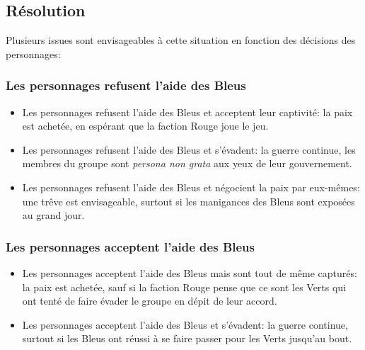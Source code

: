 \subsection{Résolution}

Plusieurs issues sont envisageables à cette situation en fonction des décisions des personnages:

\subsubsection{Les personnages refusent l'aide des Bleus}
\begin{itemize}
	\item Les personnages refusent l'aide des Bleus et acceptent leur captivité: la paix est achetée, en espérant que la faction Rouge joue le jeu.
	\item Les personnages refusent l'aide des Bleus et s'évadent: la guerre continue, les membres du groupe sont \emph{persona non grata} aux yeux de leur gouvernement.
	\item Les personnages refusent l'aide des Bleus et négocient la paix par eux-mêmes: une trêve est envisageable, surtout si les manigances des Bleus sont exposées au grand jour.
\end{itemize}

\subsubsection{Les personnages acceptent l'aide des Bleus}
\begin{itemize}
	\item Les personnages acceptent l'aide des Bleus mais sont tout de même capturés: la paix est achetée, sauf si la faction Rouge pense que ce sont les Verts qui ont tenté de faire évader le groupe en dépit de leur accord.
	\item Les personnages acceptent l'aide des Bleus et s'évadent: la guerre continue, surtout si les Bleus ont réussi à se faire passer pour les Verts jusqu'au bout.
\end{itemize}
